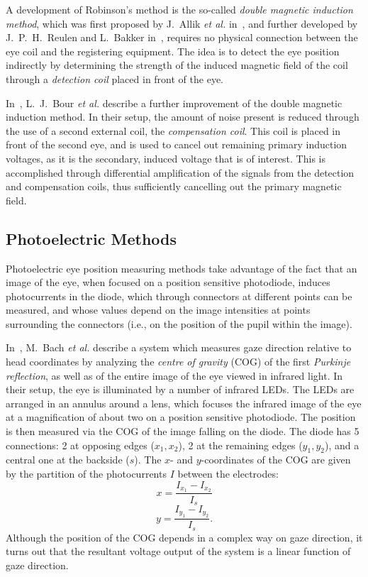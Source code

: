 A development of Robinson's method is the so-called {\em double
  magnetic induction method\/}, which was first proposed by J.\ Allik
{\em et al.\/} in~\cite{allik}, and further developed by J.\ P.\ H.\ 
Reulen and L.\ Bakker in~\cite{reulen}, requires no physical
connection between the eye coil and the registering equipment.  The
idea is to detect the eye position indirectly by determining the
strength of the induced magnetic field of the coil through a {\em
  detection coil\/} placed in front of the eye.

In~\cite{coil}, L.\ J.\ Bour {\em et al.\/} describe a further
improvement of the double magnetic induction method.  In their setup,
the amount of noise present is reduced through the use of a second
external coil, the {\em compensation coil\/}.  This coil is placed in
front of the second eye, and is used to cancel out remaining primary
induction voltages, as it is the secondary, induced voltage that is of
interest.  This is accomplished through differential amplification of
the signals from the detection and compensation coils, thus
sufficiently cancelling out the primary magnetic field.

\subsection{Photoelectric Methods}
\label{back:track:oculometer}

Photoelectric eye position measuring methods take advantage of the
fact that an image of the eye, when focused on a position sensitive
photodiode, induces photocurrents in the diode, which through
connectors at different points can be measured, and whose values
depend on the image intensities at points surrounding the connectors
(i.e., on the position of the pupil within the image).

In~\cite{oculometer}, M.\ Bach {\em et al.\/} describe a system which
measures gaze direction relative to head coordinates by analyzing the
{\em centre of gravity\/} (COG) of the first {\em Purkinje
  reflection\/}, as well as of the entire image of the eye viewed in
infrared light.  In their setup, the eye is illuminated by a number of
infrared LEDs.  The LEDs are arranged in an annulus around a lens,
which focuses the infrared image of the eye at a magnification of
about two on a position sensitive photodiode.  The position is then
measured via the COG of the image falling on the diode.  The diode has
5 connections: 2 at opposing edges ($x_{1},x_{2}$), 2 at the remaining
edges ($y_{1},y_{2}$), and a central one at the backside ($s$).  The
$x$- and $y$-coordinates of the COG are given by the partition of the
photocurrents $I$ between the electrodes:
\[x=\frac{I_{x_{1}}-I_{x_{2}}}{I_{s}}\] 
\[y=\frac{I_{y_{1}}-I_{y_{2}}}{I_{s}}\mbox{.}\] Although the position
of the COG depends in a complex way on gaze direction, it turns out
that the resultant voltage output of the system is a linear function
of gaze direction.

